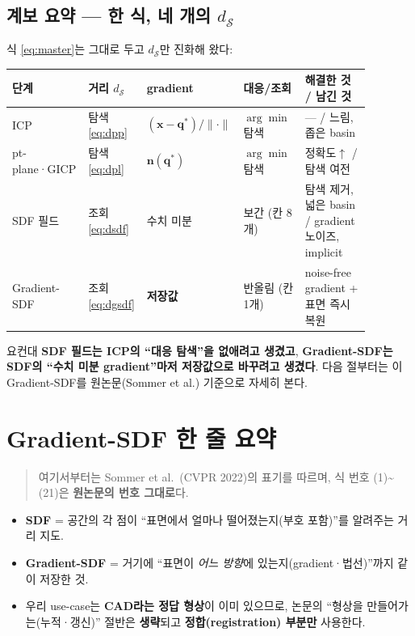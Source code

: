 \subsection{계보 요약 --- 한 식, 네 개의 $d_{\mathcal{S}}$}

식 \eqref{eq:master}는 그대로 두고 $d_{\mathcal{S}}$만 진화해 왔다:

\begin{longtable}{p{0.17\linewidth}p{0.16\linewidth}p{0.20\linewidth}p{0.17\linewidth}p{0.18\linewidth}}
\toprule
\textbf{단계} & \textbf{거리} $d_{\mathcal{S}}$ & \textbf{gradient} &
\textbf{대응/조회} & \textbf{해결한 것 / 남긴 것} \\
\midrule
ICP & 탐색 \eqref{eq:dpp} & $(\mathbf{x}-\mathbf{q}^*)/\lVert\cdot\rVert$ &
  $\arg\min$ 탐색 & --- / 느림, 좁은 basin \\
pt-plane·GICP & 탐색 \eqref{eq:dpl} & $\mathbf{n}(\mathbf{q}^*)$ &
  $\arg\min$ 탐색 & 정확도$\uparrow$ / 탐색 여전 \\
SDF 필드 & 조회 \eqref{eq:dsdf} & 수치 미분 & 보간 (칸 8개) &
  탐색 제거, 넓은 basin / gradient 노이즈, implicit \\
Gradient-SDF & 조회 \eqref{eq:dgsdf} & \textbf{저장값} & 반올림 (칸 1개) &
  noise-free gradient + 표면 즉시 복원 \\
\bottomrule
\end{longtable}

요컨대 \textbf{SDF 필드는 ICP의 ``대응 탐색''을 없애려고 생겼고},
\textbf{Gradient-SDF는 SDF의 ``수치 미분 gradient''마저 저장값으로 바꾸려고
생겼다}. 다음 절부터는 이 Gradient-SDF를 원논문(Sommer et al.) 기준으로
자세히 본다.

\section{Gradient-SDF 한 줄 요약}

\begin{quote}
  \small 여기서부터는 Sommer et al.\ (CVPR 2022)의 표기를 따르며, 식 번호
  (1)\textasciitilde(21)은 \textbf{원논문의 번호 그대로}다.
\end{quote}

\begin{itemize}
  \item \textbf{SDF} = 공간의 각 점이 ``표면에서 얼마나 떨어졌는지(부호
  포함)''를 알려주는 거리 지도.
  \item \textbf{Gradient-SDF} = 거기에 ``표면이 \emph{어느 방향}에
  있는지(gradient·법선)''까지 같이 저장한 것.
  \item 우리 use-case는 \textbf{CAD라는 정답 형상}이 이미 있으므로, 논문의
  ``형상을 만들어가는(누적·갱신)'' 절반은 \textbf{생략}되고
  \textbf{정합(registration) 부분만} 사용한다.
\end{itemize}

